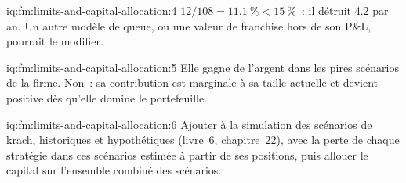 \begin{solution}{iq:fm:limits-and-capital-allocation:4}
$12/108=11.1~\%<15~\%$~: il détruit 4.2 par an. Un autre modèle de queue, ou une valeur de franchise hors de son P\&L, pourrait le modifier.
\end{solution}

\begin{solution}{iq:fm:limits-and-capital-allocation:5}
Elle gagne de l'argent dans les pires scénarios de la firme. Non~: sa contribution est marginale à sa taille actuelle et devient positive dès qu'elle domine le portefeuille.
\end{solution}

\begin{solution}{iq:fm:limits-and-capital-allocation:6}
Ajouter à la simulation des scénarios de krach, historiques et hypothétiques (livre~6, chapitre~22), avec la perte de chaque stratégie dans ces scénarios estimée à partir de
ses positions, puis allouer le capital sur l'ensemble combiné des scénarios.
\end{solution}
